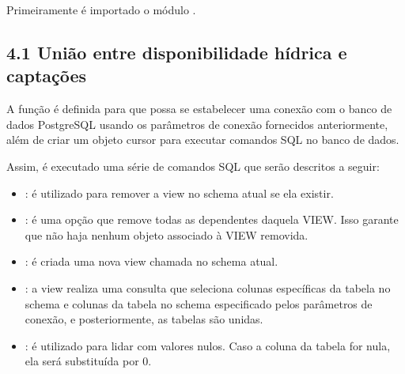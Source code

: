\documentclass[a4paper,10pt,brazil]{sphinxmanual}
\begin{document}

\sphinxAtStartPar
Primeiramente é importado o módulo .


\subsection{4.1 União entre disponibilidade hídrica e captações}
\label{\detokenize{4preparacaoDadosBalanco:uniao-entre-disponibilidade-hidrica-e-captacoes}}
\sphinxAtStartPar
A função  é definida para que possa se estabelecer uma conexão com o banco de dados PostgreSQL usando os parâmetros de conexão fornecidos anteriormente, além de criar um objeto cursor para executar comandos SQL no banco de dados.

\sphinxAtStartPar
Assim, é executado uma série de comandos SQL que serão descritos a seguir:
\begin{itemize}
\item {} 
\sphinxAtStartPar
{}: é utilizado para remover a view  no schema atual se ela existir.

\item {} 
\sphinxAtStartPar
{}: é uma opção que remove todas as dependentes daquela VIEW. Isso garante que não haja nenhum objeto associado à VIEW removida.

\item {} 
\sphinxAtStartPar
{}: é criada uma nova view chamada  no schema atual.

\item {} 
\sphinxAtStartPar
{}: a view realiza uma consulta que seleciona colunas específicas da tabela  no schema  e colunas da tabela  no schema especificado pelos parâmetros de conexão, e posteriormente, as tabelas são unidas.

\item {} 
\sphinxAtStartPar
{}: é utilizado para lidar com valores nulos. Caso a coluna  da tabela  for nula, ela será substituída por 0.

\end{itemize}
\end{document}
